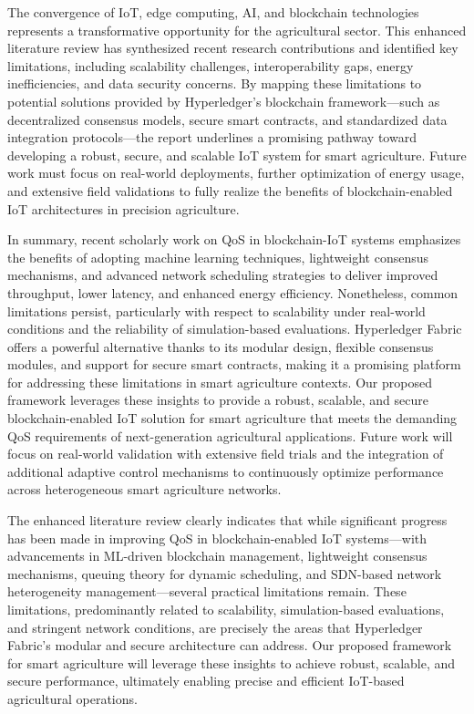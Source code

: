 \documentclass[12pt,onecolumn]{IEEEtran} %
\begin{document}
The convergence of IoT, edge computing, AI, and blockchain technologies represents a transformative opportunity for the agricultural sector. This enhanced literature review has synthesized recent research contributions \cite{atalla2023iotenabledprecisionagriculture, akhter2022precisionagricultureusing, atalla2023iotenabledprecisionagriculture, bayih2022utilizationofinternet, ouafiq2022datamanagementand} and identified key limitations, including scalability challenges, interoperability gaps, energy inefficiencies, and data security concerns. By mapping these limitations to potential solutions provided by Hyperledger’s blockchain framework—such as decentralized consensus models, secure smart contracts, and standardized data integration protocols—the report underlines a promising pathway toward developing a robust, secure, and scalable IoT system for smart agriculture. Future work must focus on real-world deployments, further optimization of energy usage, and extensive field validations to fully realize the benefits of blockchain-enabled IoT architectures in precision agriculture.

In summary, recent scholarly work on QoS in blockchain-IoT systems emphasizes the benefits of adopting machine learning techniques, lightweight consensus mechanisms, and advanced network scheduling strategies to deliver improved throughput, lower latency, and enhanced energy efficiency. Nonetheless, common limitations persist, particularly with respect to scalability under real-world conditions and the reliability of simulation-based evaluations. Hyperledger Fabric offers a powerful alternative thanks to its modular design, flexible consensus modules, and support for secure smart contracts, making it a promising platform for addressing these limitations in smart agriculture contexts. Our proposed framework leverages these insights to provide a robust, scalable, and secure blockchain-enabled IoT solution for smart agriculture that meets the demanding QoS requirements of next-generation agricultural applications. Future work will focus on real-world validation with extensive field trials and the integration of additional adaptive control mechanisms to continuously optimize performance across heterogeneous smart agriculture networks.

The enhanced literature review clearly indicates that while significant progress has been made in improving QoS in blockchain-enabled IoT systems—with advancements in ML-driven blockchain management, lightweight consensus mechanisms, queuing theory for dynamic scheduling, and SDN-based network heterogeneity management—several practical limitations remain. These limitations, predominantly related to scalability, simulation-based evaluations, and stringent network conditions, are precisely the areas that Hyperledger Fabric's modular and secure architecture can address. Our proposed framework for smart agriculture will leverage these insights to achieve robust, scalable, and secure performance, ultimately enabling precise and efficient IoT-based agricultural operations.
\end{document}
